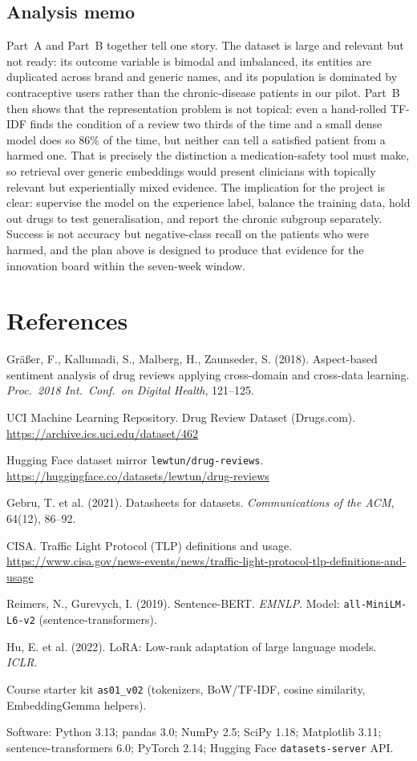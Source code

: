 \documentclass[11pt]{article}
\newcommand{\code}[1]{\texttt{#1}}
\begin{document}
\subsection{Analysis memo}
Part~A and Part~B together tell one story. The dataset is large and relevant but not ready: its outcome variable is bimodal and imbalanced, its entities are duplicated across brand and generic names, and its population is dominated by contraceptive users rather than the chronic-disease patients in our pilot. Part~B then shows that the representation problem is not topical: even a hand-rolled TF-IDF finds the condition of a review two thirds of the time and a small dense model does so 86\% of the time, but neither can tell a satisfied patient from a harmed one. That is precisely the distinction a medication-safety tool must make, so retrieval over generic embeddings would present clinicians with topically relevant but experientially mixed evidence. The implication for the project is clear: supervise the model on the experience label, balance the training data, hold out drugs to test generalisation, and report the chronic subgroup separately. Success is not accuracy but negative-class recall on the patients who were harmed, and the plan above is designed to produce that evidence for the innovation board within the seven-week window.

\section*{References}
\begin{enumerate}[label={[\arabic*]}]
\item Gr\"a{\ss}er, F., Kallumadi, S., Malberg, H., Zaunseder, S. (2018). Aspect-based sentiment analysis of drug reviews applying cross-domain and cross-data learning. \emph{Proc.\ 2018 Int.\ Conf.\ on Digital Health}, 121--125.
\item UCI Machine Learning Repository. Drug Review Dataset (Drugs.com). \url{https://archive.ics.uci.edu/dataset/462}
\item Hugging Face dataset mirror \code{lewtun/drug-reviews}. \url{https://huggingface.co/datasets/lewtun/drug-reviews}
\item Gebru, T. et al. (2021). Datasheets for datasets. \emph{Communications of the ACM}, 64(12), 86--92.
\item CISA. Traffic Light Protocol (TLP) definitions and usage. \url{https://www.cisa.gov/news-events/news/traffic-light-protocol-tlp-definitions-and-usage}
\item Reimers, N., Gurevych, I. (2019). Sentence-BERT. \emph{EMNLP}. Model: \code{all-MiniLM-L6-v2} (sentence-transformers).
\item Hu, E. et al. (2022). LoRA: Low-rank adaptation of large language models. \emph{ICLR}.
\item Course starter kit \code{as01\_v02} (tokenizers, BoW/TF-IDF, cosine similarity, EmbeddingGemma helpers).
\item Software: Python 3.13; pandas 3.0; NumPy 2.5; SciPy 1.18; Matplotlib 3.11; sentence-transformers 6.0; PyTorch 2.14; Hugging Face \code{datasets-server} API.
\end{enumerate}
\end{document}
